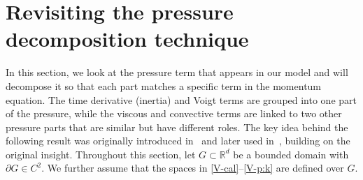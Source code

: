 \documentclass[12pt,reqno]{amsart}
\numberwithin{equation}{section}
\theoremstyle{definition}
\begin{document}
\section{Revisiting the pressure decomposition technique}\label{PD}
In this section, we look at the pressure term that appears in our model and will decompose it so that each part matches a specific term in the momentum equation.
The time derivative (inertia) and Voigt terms are grouped into one part of the pressure, while the viscous and convective terms are linked to two other pressure parts that are similar but have different roles.
The key idea behind the following result was originally introduced in~\cite{Wolf:2007} and later used in~\cite{DRW}, building on the original insight.
{Throughout this section, let $G \subset \mathbb{R}^d$ be a bounded domain with $\partial G \in C^2$.
We further assume that the spaces in \eqref{V-cal}--\eqref{V-p:k} are defined over $G$.} %
\end{document}
